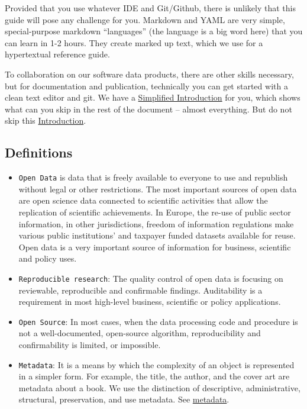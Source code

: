 \documentclass[
  fontsize=13pt,
  english,
  a4paper,
  openany, a4paper, oneside]{article}
\begin{document}
Provided that you use whatever IDE and Git/Github, there is unlikely that this guide will pose any challenge for you. Markdown and YAML are very simple, special-purpose markdown ``languages'' (the language is a big word here) that you can learn in 1-2 hours. They create marked up text, which we use for a hypertextual reference guide.

To collaboration on our software data products, there are other skills necessary, but for documentation and publication, technically you can get started with a clean text editor and git. We have a \protect\hyperlink{simple-intro}{Simplified Introduction} for you, which shows what can you skip in the rest of the document -- almost everything. But do not skip this \protect\hyperlink{intro}{Introduction}.

\hypertarget{definitions}{%
\subsection{Definitions}\label{definitions}}

\begin{itemize}
\item
  \texttt{Open\ Data} is data that is freely available to everyone to use and republish without legal or other restrictions. The most important sources of open data are open science data connected to scientific activities that allow the replication of scientific achievements. In Europe, the re-use of public sector information, in other jurisdictions, freedom of information regulations make various public institutions' and taxpayer funded datasets available for reuse. Open data is a very important source of information for business, scientific and policy uses.
\item
  \texttt{Reproducible\ research}: The quality control of open data is focusing on reviewable, reproducible and confirmable findings. Auditability is a requirement in most high-level business, scientific or policy applications.
\item
  \texttt{Open\ Source}: In most cases, when the data processing code and procedure is not a well-documented, open-source algorithm, reproducibility and confirmability is limited, or impossible.
\item
  \texttt{Metadata}: It is a means by which the complexity of an object is represented in a simpler form. For example, the title, the author, and the cover art are metadata about a book. We use the distinction of descriptive, administrative, structural, preservation, and use metadata. See \protect\hyperlink{metadata}{metadata}.
\end{itemize}
\end{document}

